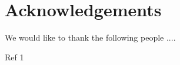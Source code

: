 \documentclass[compsoc,a4paper,12pt,conference,onecolumn]{IEEEtran}
\begin{document}





\tableofcontents








\section{Acknowledgements}
We would like to thank the following people ....

\begin{thebibliography}{}
 Ref 1

\end{thebibliography}
\end{document}
